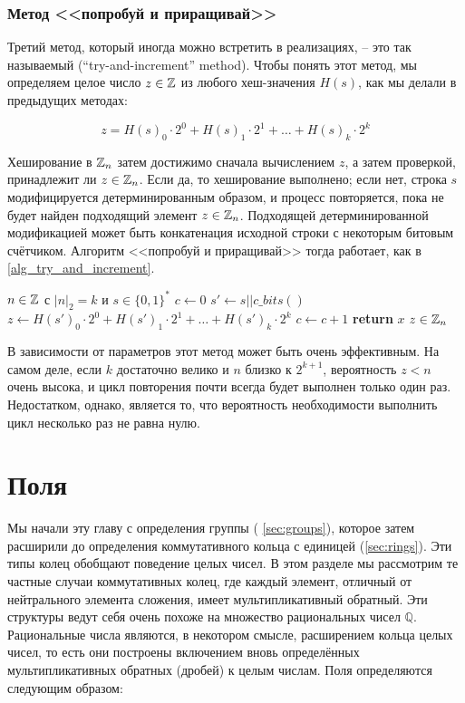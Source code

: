 \subsubsection{Метод <<попробуй и приращивай>>}\label{def:try_and_increment_hash}

Третий метод, который иногда можно встретить в реализациях, -- это так называемый  (``try-and-increment'' method). Чтобы понять этот метод, мы определяем целое число $z\in\mathbb{Z}$ из любого хеш-значения $H(s)$, как мы делали в предыдущих методах:

\begin{equation}
z = H(s)_0\cdot 2^0 + H(s)_1\cdot 2^1 + \ldots + H(s)_{k}\cdot 2^{k}
\end{equation}

Хеширование в $\Z_n$ затем достижимо сначала вычислением $z$, а затем проверкой, принадлежит ли $z\in\mathbb{Z}_n$. Если да, то хеширование выполнено; если нет, строка $s$ модифицируется детерминированным образом, и процесс повторяется, пока не будет найден подходящий элемент $z\in\mathbb{Z}_n$. Подходящей детерминированной модификацией может быть конкатенация исходной строки с некоторым битовым счётчиком. Алгоритм <<попробуй и приращивай>> тогда работает, как в \algname{} \ref{alg_try_and_increment}.
\begin{algorithm}\caption{Хеш-в-$\Z_n$}
\label{alg_try_and_increment}
\begin{algorithmic}[0]
\Require $n \in \mathbb{Z}$ с $|n|_2=k$ и $s\in\{0,1\}^*$
\State $c \gets 0$
\Repeat
\State $s' \gets s||c\_bits()$
\State $z \gets H(s')_0\cdot 2^0 + H(s')_1\cdot 2^1 + \ldots + H(s')_{k}\cdot 2^{k}$
\State $c\gets c+1$
\State \textbf{return} $x$
\EndProcedure
\Ensure $ z\in \mathbb{Z}_n$
\end{algorithmic}
\end{algorithm}

В зависимости от параметров этот метод может быть очень эффективным. На самом деле, если $k$ достаточно велико и $n$ близко к $2^{k+1}$, вероятность $z<n$ очень высока, и цикл повторения почти всегда будет выполнен только один раз. Недостатком, однако, является то, что вероятность необходимости выполнить цикл несколько раз не равна нулю.

\section{Поля}\label{sec:fields}
Мы начали эту главу с определения группы (\secname{} \ref{sec:groups}), которое затем расширили до определения коммутативного кольца с единицей (\secname \ref{sec:rings}). Эти типы колец обобщают поведение целых чисел. В этом разделе мы рассмотрим те частные случаи коммутативных колец, где каждый элемент, отличный от нейтрального элемента сложения, имеет мультипликативный обратный. Эти структуры ведут себя очень похоже на множество рациональных чисел $\mathbb{Q}$. Рациональные числа являются, в некотором смысле, расширением кольца целых чисел, то есть они построены включением вновь определённых мультипликативных обратных (дробей) к целым числам. Поля определяются следующим образом:

